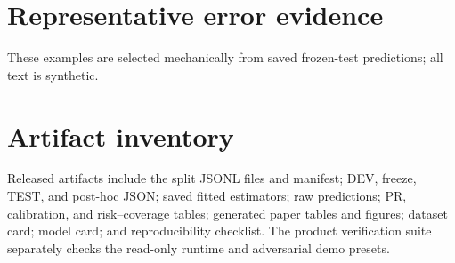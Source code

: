 \documentclass[10pt,twocolumn]{article}
\begin{document}
\section{Representative error evidence}\label{app:errors}

\smallskip
\noindent These examples are selected mechanically from saved frozen-test predictions; all text is synthetic.

\section{Artifact inventory}
Released artifacts include the split JSONL files and manifest; DEV, freeze, TEST, and post-hoc JSON; saved fitted estimators; raw predictions; PR, calibration, and risk--coverage tables; generated paper tables and figures; dataset card; model card; and reproducibility checklist. The product verification suite separately checks the read-only runtime and adversarial demo presets.



\end{document}
